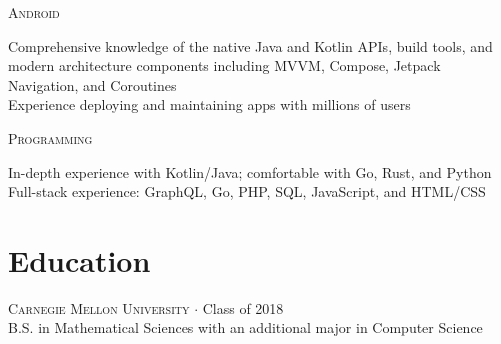 \documentclass[letterpaper,10pt]{article}
\newenvironment{lcol}
{
    \begin{minipage}[t]{.185\linewidth}
    \begin{flushright}
}
{
    \end{flushright}
    \end{minipage}
}
\newenvironment{rcol}
{
    \begin{minipage}[t]{.8\linewidth}
}
{
    \end{minipage}
}
\begin{document}
\begin{lcol}
    \textsc{ Android}
\end{lcol}
\begin{rcol}
    Comprehensive knowledge of the native Java and Kotlin APIs, build tools, and modern architecture components including MVVM, Compose, Jetpack Navigation, and Coroutines\vspace{4pt} \\
    Experience deploying and maintaining apps with millions of users
\end{rcol}

\vspace{6pt}

\begin{lcol}
    \textsc{Programming}
\end{lcol}
\begin{rcol}
    In-depth experience with Kotlin/Java; comfortable with Go, Rust, and Python
    \vspace{4pt} \\
    Full-stack experience: GraphQL, Go, PHP, SQL, JavaScript, and HTML/CSS
\end{rcol}

\section{Education}

\textsc{Carnegie Mellon University} $\cdot$ Class of 2018 \\
\-\hspace{.28in} B.S. in Mathematical Sciences with an additional major in Computer Science
\end{document}
